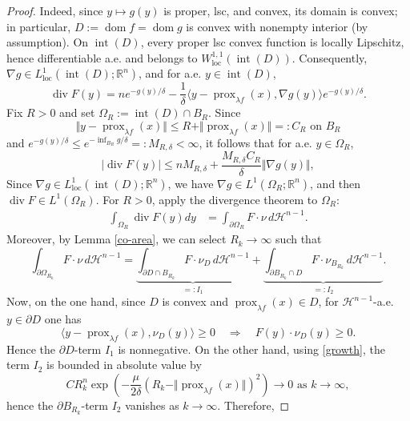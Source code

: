 \documentclass[11pt]{amsart}
\newcommand{\1}{\mathds{1}}
\theoremstyle{definition}
\theoremstyle{remark}
\theoremstyle{definition}
\begin{document}
\begin{proof}
Indeed, since $y\mapsto g(y)$ is proper, lsc, and convex, its domain is convex; in particular, $D:=\operatorname{dom}f=\operatorname{dom}g$ is convex with nonempty interior (by assumption). On $\operatorname{int}(D)$, every proper lsc convex function is locally Lipschitz, hence differentiable a.e. and belongs to $W^{1,1}_{\operatorname{loc}}(\operatorname{int}(D))$. Consequently, $\nabla g\in L^1_{\operatorname{loc}}(\operatorname{int}(D);\mathbb{R}^n)$, and for a.e. $y \in \operatorname{int}(D)$,
$$
\operatorname{div}F(y)=ne^{-g(y)/\delta}-\frac{1}{\delta}\langle y-\operatorname{prox}_{\lambda f}(x),\nabla g(y)\rangle e^{-g(y)/\delta}.
$$
Fix $R>0$ and set $\Omega_R:=\operatorname{int}(D) \cap B_R $. Since 
$$\Vert y-\operatorname{prox}_{\lambda f}(x)\Vert \leq R+\Vert \operatorname{prox}_{\lambda f}(x)\Vert =:C_R \textrm{ on } B_R
$$
and $e^{-g(y)/\delta}\leq e^{-\inf_{B_R}g/\delta}=:M_{R,\delta}<\infty$, it follows that for a.e. $y\in \Omega_{R}$,
$$
\vert \operatorname{div}F(y)\vert \leq nM_{R,\delta}+\frac{M_{R,\delta}C_{R}}{\delta}\Vert \nabla g(y)\Vert,
$$
Since $\nabla g\in L^1_{\operatorname{loc}}(\operatorname{int}(D);\mathbb{R}^n)$, we have $\nabla g\in L^1(\Omega_R;\mathbb{R}^n)$, and then $\operatorname{div}F\in L^1(\Omega_R)$. For $R>0$, apply the divergence theorem to $\Omega_R$:
\begin{equation*}
    \begin{aligned}
\int_{\Omega_R}\operatorname{div}F(y)dy&=\int_{\partial \Omega_R} F\cdot \nu\, d\mathcal{H}^{n-1}.
    \end{aligned}
\end{equation*}
Moreover, by Lemma \ref{co-area}, we can select $R_k\to \infty$ such that
\[
\int_{\partial \Omega_{R_k}} F \cdot \nu \, d\mathcal{H}^{n-1}
=
\underbrace{\int_{\partial D\cap {B}_{R_k}}
 F \cdot \nu_{D} \, d\mathcal{H}^{n-1}}_{=:I_1}+\underbrace{\int_{\partial {B}_{R_k}\cap D}
 F\cdot \nu_{{B}_{R_k}} \, d\mathcal{H}^{n-1}}_{=:I_2}.
\]
Now, on the one hand, since $D$ is convex and $\operatorname{prox}_{\lambda f}(x)\in D$, for $\mathcal{H}^{n-1}$-a.e. $y\in \partial D$ one has
$$
\langle y-\operatorname{prox}_{\lambda f}(x),\nu_D(y)\rangle \geq 0 \quad \Rightarrow \quad   F(y)\cdot \nu_D(y) \geq 0.
$$
Hence the $\partial D$-term  $I_1$ is nonnegative.  On the other hand, using \eqref{growth}, the term $I_2$  is bounded in absolute value by 
$$
CR_k^n \exp\left(-\frac{\mu}{2\delta}(R_k-\Vert \operatorname{prox}_{\lambda f}(x) \Vert)^2\right)\to 0 \textrm{ as } k\to \infty,
$$
hence the $\partial {B}_{R_k}$-term $I_2$ vanishes as $k\to \infty$. Therefore,

\end{proof}
\end{document}
